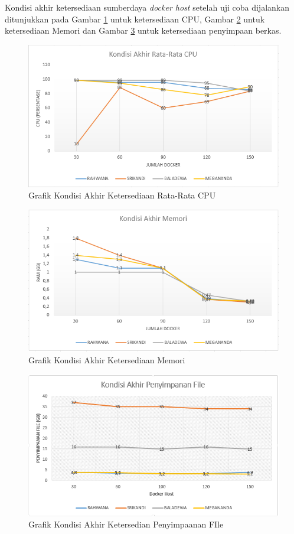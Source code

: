 Kondisi akhir ketersediaan sumberdaya \textit{docker host} setelah uji coba dijalankan ditunjukkan pada Gambar \ref{Grafik CPU RAHWANA} untuk ketersediaan CPU, Gambar \ref{Grafik RAM RAHWANA} untuk ketersediaan Memori dan Gambar \ref{Grafik DF RAHWANA} untuk ketersediaan penyimpaan berkas. 
\begin{figure}[H]
        \centering
        \includegraphics[width=\linewidth]{images/bab5/cpu}
        \caption{Grafik Kondisi Akhir Ketersediaan Rata-Rata CPU}
        \label{Grafik CPU RAHWANA}
      \end{figure} 
\begin{figure}[H]
        \centering
        \includegraphics[width=\linewidth]{images/bab5/memori}
        \caption{Grafik Kondisi Akhir Ketersediaan Memori}
        \label{Grafik RAM RAHWANA}
      \end{figure} 
\begin{figure}[H]
        \centering
        \includegraphics[width=\linewidth]{images/bab5/Storage}
        \caption{Grafik Kondisi Akhir Ketersedian Penyimpaanan FIle}
        \label{Grafik DF RAHWANA}
      \end{figure} 

